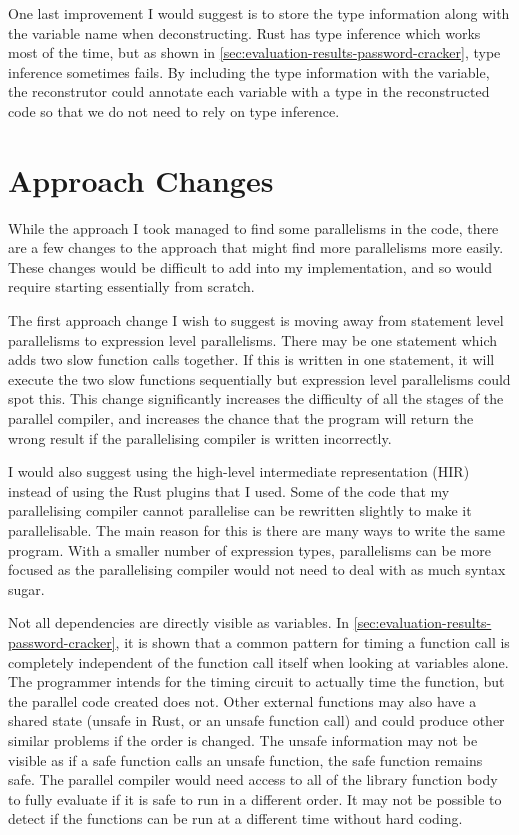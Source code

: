 One last improvement I would suggest is to store the type information along with the variable name when deconstructing. Rust has type inference which works most of the time, but as shown in \autoref{sec:evaluation-results-password-cracker}, type inference sometimes fails. By including the type information with the variable, the reconstrutor could annotate each variable with a type in the reconstructed code so that we do not need to rely on type inference.

\section{Approach Changes}
While the approach I took managed to find some parallelisms in the code, there are a few changes to the approach that might find more parallelisms more easily. These changes would be difficult to add into my implementation, and so would require starting essentially from scratch.

The first approach change I wish to suggest is moving away from statement level parallelisms to expression level parallelisms. There may be one statement which adds two slow function calls together. If this is written in one statement, it will execute the two slow functions sequentially but expression level parallelisms could spot this. This change significantly increases the difficulty of all the stages of the parallel compiler, and increases the chance that the program will return the wrong result if the parallelising compiler is written incorrectly.

I would also suggest using the high-level intermediate representation (HIR) instead of using the Rust plugins that I used. Some of the code that my parallelising compiler cannot parallelise can be rewritten slightly to make it parallelisable. The main reason for this is there are many ways to write the same program. With a smaller number of expression types, parallelisms can be more focused as the parallelising compiler would not need to deal with as much syntax sugar.

Not all dependencies are directly visible as variables. In \autoref{sec:evaluation-results-password-cracker}, it is shown that a common pattern for timing a function call is completely independent of the function call itself when looking at variables alone. The programmer intends for the timing circuit to actually time the function, but the parallel code created does not. Other external functions may also have a shared state (unsafe in Rust, or an unsafe function call) and could produce other similar problems if the order is changed. The unsafe information may not be visible as if a safe function calls an unsafe function, the safe function remains safe. The parallel compiler would need access to all of the library function body to fully evaluate if it is safe to run in a different order. It may not be possible to detect if the functions can be run at a different time without hard coding.
